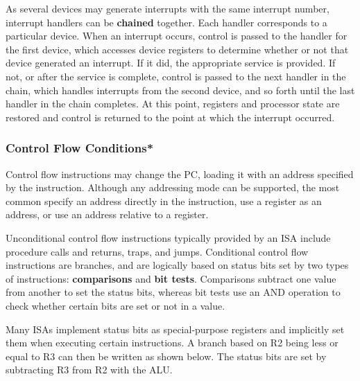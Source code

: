 As several devices may generate interrupts with the same interrupt
number, interrupt handlers can be {\bf chained} together.  Each
handler corresponds to a particular device.  When an interrupt occurs,
control is passed to the handler for the first device, which accesses
device registers to determine whether or not that device generated an
interrupt.  If it did, the appropriate service is provided.  If not,
or after the service is complete, control is passed to the next
handler in the chain, which handles interrupts from the second device,
and so forth until the last handler in the chain completes.  At this
point, registers and processor state are restored and control is
returned to the point at which the interrupt occurred.\\


\vfill
\pagebreak

\subsubsection{Control Flow Conditions*}

Control flow instructions may change the PC, loading it with an
address specified by the instruction.  Although any addressing mode
can be supported, the most common specify an address directly in the
instruction, use a register as an address, or use an address relative
to a register.  

Unconditional control flow instructions typically provided by an ISA
include procedure calls and returns, traps, and jumps.  Conditional
control flow instructions are branches, and are logically based on
status bits set by two types of instructions: {\bf comparisons} and
{\bf bit tests}.  Comparisons subtract one value from another to set
the status bits, whereas bit tests use an AND operation to
check whether certain bits are set or not in a value.

Many ISAs implement
status bits as special-purpose registers and implicitly set them when
executing
certain instructions.  A branch based on R2 being less or equal to R3
can then be written as shown below.  The status bits are set by
subtracting R3 from R2 with the ALU.

